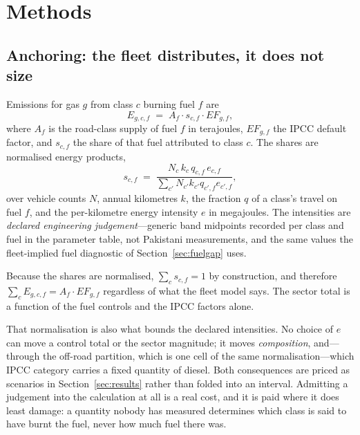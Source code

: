 \section{Methods}
\label{sec:methods}

\subsection{Anchoring: the fleet distributes, it does not size}

Emissions for gas $g$ from class $c$ burning fuel $f$ are
\begin{equation}
E_{g,c,f} \;=\; A_f \cdot s_{c,f} \cdot EF_{g,f},
\end{equation}
where $A_f$ is the road-class supply of fuel $f$ in terajoules, $EF_{g,f}$ the IPCC default
factor, and $s_{c,f}$ the share of that fuel attributed to class $c$. The shares are
normalised energy products,
\begin{equation}
s_{c,f} \;=\; \frac{N_c \, k_c \, q_{c,f} \, e_{c,f}}
                   {\sum_{c'} N_{c'} k_{c'} q_{c',f} e_{c',f}},
\end{equation}
over vehicle counts $N$, annual kilometres $k$, the fraction $q$ of a class's travel on
fuel $f$, and the per-kilometre energy intensity $e$ in megajoules. The intensities are
\emph{declared engineering judgement}---generic band midpoints recorded per class and
fuel in the parameter table, not Pakistani measurements, and the same values the
fleet-implied fuel diagnostic of Section~\ref{sec:fuelgap} uses.

Because the shares are normalised, $\sum_c s_{c,f} = 1$ by construction, and therefore
$\sum_c E_{g,c,f} = A_f \cdot EF_{g,f}$ regardless of what the fleet model says. The sector
total is a function of the fuel controls and the IPCC factors alone.

That normalisation is also what bounds the declared intensities. No choice of $e$ can
move a control total or the sector magnitude; it moves \emph{composition}, and---through
the off-road partition, which is one cell of the same normalisation---which IPCC
category carries a fixed quantity of diesel. Both consequences are priced as scenarios
in Section~\ref{sec:results} rather than folded into an interval. Admitting a judgement
into the calculation at all is a real cost, and it is paid where it does least damage:
a quantity nobody has measured determines which class is said to have burnt the fuel,
never how much fuel there was.

